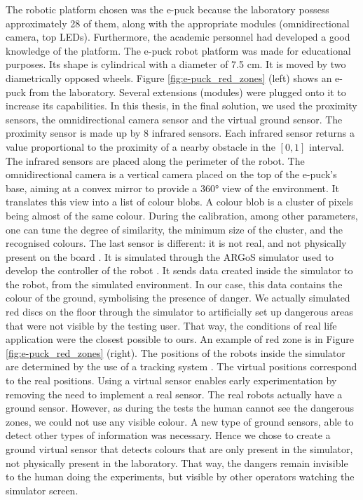 \documentclass[oneside, a4paper, 12pt]{memoir}
\begin{document}
		The robotic platform chosen was the e-puck \citep{mondada2009puck} because the laboratory possess approximately 28 of them, along with the appropriate modules (omnidirectional camera, top LEDs). Furthermore, the academic personnel had developed a good knowledge of the platform. The e-puck robot platform was made for educational purposes. Its shape is cylindrical with a diameter of 7.5 cm. It is moved by two diametrically opposed wheels. Figure \ref{fig:e-puck_red_zones} (left) shows an e-puck from the laboratory. Several extensions (modules) were plugged onto it to increase its capabilities. In this thesis, in the final solution, we used the proximity sensors, the omnidirectional camera sensor and the virtual ground sensor. The proximity sensor is made up by 8 infrared sensors. Each infrared sensor returns a value proportional to the proximity of a nearby obstacle in the $[0,1]$ interval. The infrared sensors are placed along the perimeter of the robot. The omnidirectional camera is a vertical camera placed on the top of the e-puck's base, aiming at a convex mirror to provide a 360° view of the environment. It translates this view into a list of colour blobs. A colour blob is a cluster of pixels being almost of the same colour. During the calibration, among other parameters, one can tune the degree of similarity, the minimum size of the cluster, and the recognised colours. The last sensor is different: it is not real, and not physically present on the board \citep{reinaaugmented}. It is simulated through the ARGoS simulator used to develop the controller of the robot \citep{pinciroli2012argos,GarFraBruPinBir2015:techreport-004}. It sends data created inside the simulator to the robot, from the simulated environment. In our case, this data contains the colour of the ground, symbolising the presence of danger. We actually simulated red discs on the floor through the simulator to artificially set up dangerous areas that were not visible by the testing user. That way, the conditions of real life application were the closest possible to ours. An example of red zone is in Figure \ref{fig:e-puck_red_zones} (right). The positions of the robots inside the simulator are determined by the use of a tracking system \citep{stranieri2013iridia}. The virtual positions correspond to the real positions. Using a virtual sensor enables early experimentation by removing the need to implement a real sensor. The real robots actually have a ground sensor. However, as during the tests the human cannot see the dangerous zones, we could not use any visible colour. A new type of ground sensors, able to detect other types of information was necessary. Hence we chose to create a ground virtual sensor that detects colours that are only present in the simulator, not physically present in the laboratory. That way, the dangers remain invisible to the human doing the experiments, but visible by other operators watching the simulator screen.
		
\end{document}
